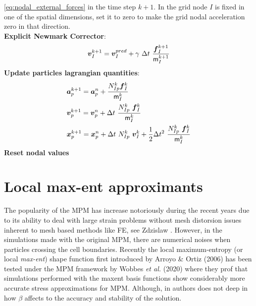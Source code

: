 \begin{algorithm}
\begin{algorithmic}[1]
    \eqref{eq:nodal_external_forces} in the time step $k+1$.
    In the grid node $I$ is fixed in one of the spatial dimensions, set it to
    zero to make the grid nodal acceleration zero in that direction.\\
    \STATE \textbf{Explicit Newmark Corrector}:
    \begin{equation*}
      \vec{v}_{I}^{k+1} = \vec{v}_{I}^{pred} + \gamma\ \Delta t\ \frac{\vec{f}_{I}^{k+1}}{\tens{m}_I^{k+1}}  
    \end{equation*}
    \STATE \textbf{Update particles lagrangian quantities}:
    \begin{align*}
      &\vec{a}_p^{k+1} = \vec{a}_p^n +
        \frac{N_{Ip}^k\vec{f}_{I}^{k}}{\tens{m}_I^k}\\
      &\vec{v}_p^{k+1} = \vec{v}_p^n + \Delta t\
        \frac{N_{Ip}^k\
        \vec{f}_{I}^{k}}{\tens{m}_I^k}\\
      &\vec{x}_p^{k+1} = \vec{x}_p^n + \Delta t\
         N_{Ip}^k\ \vec{v}_{I}^{k} +
        \frac{1}{2}\Delta t^2\ \frac{N_{Ip}^k\
        \vec{f}_{I}^{k}}{\tens{m}_I^k}
    \end{align*}
    \STATE \textbf{Reset nodal values}
  \end{algorithmic}
\end{algorithm} 

\section{Local max-ent approximants}
\label{sec:local-max-ent}


The popularity of the MPM has increase notoriously during
the recent years due to its ability to deal with large strain problems
without mesh distorsion issues inherent to mesh based methods like
FE, see Zdzislaw \cite{Wieckowski2004}. However, in the simulations made with the original MPM, there are
numerical noises when particles crossing the cell boundaries. Recently
the local maximum-entropy (or local \textit{max-ent}) shape function
first introduced by Arroyo \& Ortiz (2006)\cite{Arroyo2006} has been
tested under the MPM framework by Wobbes {\it et al.} (2020)\cite{Wobbes2020} where they prof that
simulations performed with the maxent basis functions show
considerably more accurate stress approximations for MPM. Although, in
\cite{Wobbes2020} authors does not deep in how $\beta$ affects to the
accuracy and stability of the solution.

